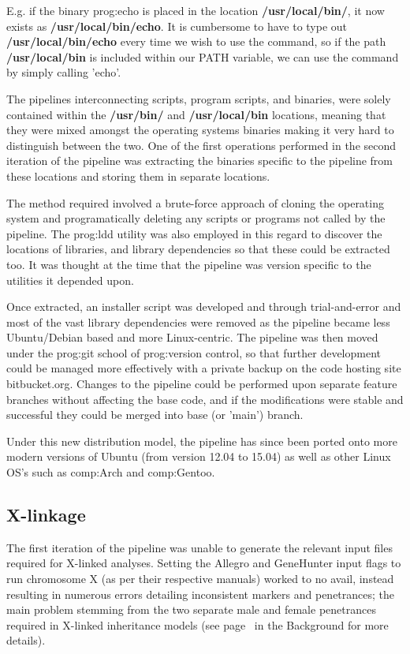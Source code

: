 E.g. if the binary \gls{prog:echo} is placed in the location \textbf{/usr/local/bin/}, it now exists as \textbf{/usr/local/bin/echo}. It is cumbersome to have to type out \textbf{/usr/local/bin/echo} every time we wish to use the command, so if the path \textbf{/usr/local/bin} is included within our PATH variable, we can use the command by simply calling 'echo'.

The pipelines interconnecting scripts, program scripts, and binaries, were solely contained within the \textbf{/usr/bin/} and \textbf{/usr/local/bin} locations, meaning that they were mixed amongst the operating systems binaries making it very hard to distinguish between the two. One of the first operations performed in the second iteration of the pipeline was extracting the binaries specific to the pipeline from these locations and storing them in separate locations.

The method required involved a brute-force approach of cloning the operating system and programatically deleting any scripts or programs not called by the pipeline. The \gls{prog:ldd} utility was also employed in this regard to discover the locations of libraries, and library dependencies so that these could be extracted too. It was thought at the time that the pipeline was version specific to the utilities it depended upon.

Once extracted, an installer script was developed and through trial-and-error and most of the vast library dependencies were removed as the pipeline became less Ubuntu/Debian based and more Linux-centric. The pipeline was then moved under the \gls{prog:git} school of \gls{prog:version control}, so that further development could be managed more effectively with a private backup on the code hosting site bitbucket.org. Changes to the pipeline could be performed upon separate feature branches without affecting the base code, and if the modifications were stable and successful they could be merged into base (or 'main') branch.

Under this new distribution model, the pipeline has since been ported onto more modern versions of Ubuntu (from version 12.04 to 15.04) as well as other Linux OS's such as \gls{comp:Arch} and \gls{comp:Gentoo}.


\subsection{X-linkage}

The first iteration of the pipeline was unable to generate the relevant input files required for X-linked analyses. Setting the Allegro and GeneHunter input flags to run chromosome X (as per their respective manuals) worked to no avail, instead resulting in numerous errors detailing inconsistent markers and penetrances; the main problem stemming from the two separate male and female penetrances required in X-linked inheritance models (see page~\pageref{ref:back:xlinkrec} in the Background for more details).

